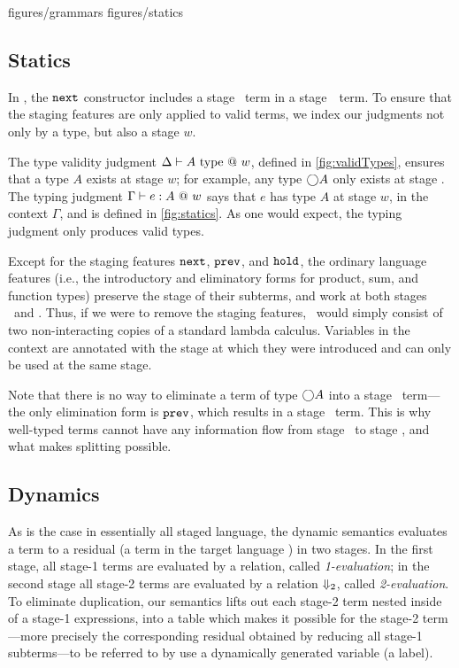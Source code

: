  {figures/grammars}
 {figures/statics}

\subsection{Statics}

In \lang, the ${\tt next}$ constructor includes a stage \bbtwo\ term in a
stage~\bbone\ term. To ensure that the staging features are only applied to
valid terms, we index our judgments not only by a type, but also a stage $w$.

The type validity judgment $\Delta \vdash A ~{\rm type}~@~w$, defined in
\cref{fig:validTypes}, ensures that a type $A$ exists at stage $w$; for
example, any type $\bigcirc A$ only exists at stage \bbone.  The typing judgment
$\Gamma{} \vdash {e}:{A}~@~w$ says that $e$ has type $A$ at stage $w$, in the context
$\Gamma$, and is defined in \cref{fig:statics}.  As one would expect, the
typing judgment only produces valid types.

Except for the staging features ${\tt next}$, ${\tt prev}$, and ${\tt hold}$, the ordinary
language features (i.e., the introductory and eliminatory forms for product,
sum, and function types) preserve the stage of their subterms, and work at both
stages \bbone\ and \bbtwo. Thus, if we were to remove the staging features,
\lang\ would simply consist of two non-interacting copies of a standard lambda
calculus. Variables in the context are annotated with the stage at which they
were introduced and can only be used at the same stage.

Note that there is no way to eliminate a term of type $\bigcirc A$ into a stage
\bbone\ term---the only elimination form is ${\tt prev}$, which results in a stage
\bbtwo\ term. This is why well-typed terms cannot have any information flow
from stage \bbtwo\ to stage \bbone, and what makes splitting possible.

\subsection{Dynamics}
\label{sec:stagedsemantics}

As is the case in essentially all staged language, the dynamic
semantics evaluates a term to a residual (a term in the target
language \langmono) in two stages. In the first stage, all stage-1
terms are evaluated by a relation, called {\em 1-evaluation}; in the
second stage all stage-2 terms are evaluated by a relation
${\Downarrow_{ 2}}$, called {\em 2-evaluation}.  To eliminate duplication,
our semantics lifts out each stage-2 term nested inside of a stage-1
expressions, into a table which makes it possible for the stage-2
term---more precisely the corresponding residual obtained by reducing
all stage-1 subterms---to be referred to by use a dynamically
generated variable (a label).

